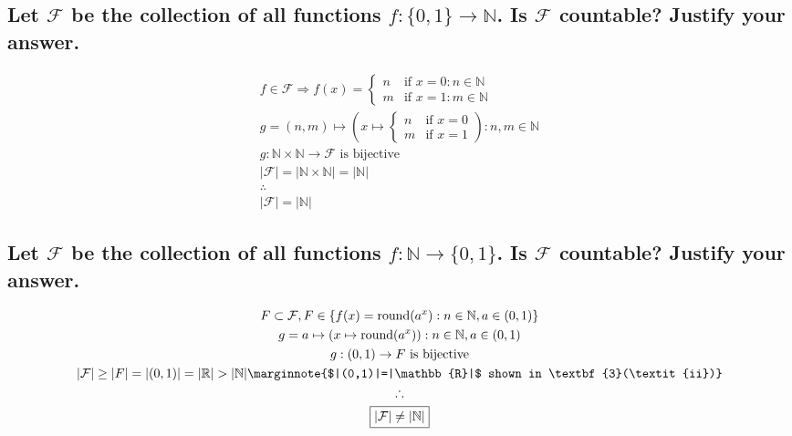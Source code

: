 \documentclass[letterpaper]{article}
\begin{document}
\subsection{Let $\mathcal{F}$ be the collection of all functions $f:\{0,1\}\rightarrow\mathbb{N}$. Is $\mathcal{F}$ countable? Justify your answer.}
\begin{gather*}
f\in\mathcal{F}\Rightarrow f(x)=\begin{cases}
n & \text{if } x=0:n\in\mathbb{N} \\
m & \text{if } x=1:m\in\mathbb{N}
\end{cases} \\
g=(n,m)\mapsto (x\mapsto\begin{cases}
n & \text{if } x=0 \\
m & \text{if } x=1
\end{cases}):n,m\in\mathbb{N} \\
g:\mathbb{N}\times\mathbb{N}\rightarrow\mathcal{F}\text{ is bijective} \\
|\mathcal{F}|=|\mathbb{N}\times\mathbb{N}|=|\mathbb{N}| \\
\therefore \\
\boxed{|\mathcal{F}|=|\mathbb{N}|}
\end{gather*}
\subsection{Let $\mathcal{F}$ be the collection of all functions $f:\mathbb{N}\rightarrow\{0,1\}$. Is $\mathcal{F}$ countable? Justify your answer.}
\begin{gather*}
F\subset\mathcal{F},F\in \{f(x)=\text{round}(a^x): n\in\mathbb{N},a\in(0, 1)\} \\
g=a\mapsto(x\mapsto\text{round}(a^x)):n\in\mathbb{N},a\in(0, 1) \\
g:(0,1)\rightarrow F\text{ is bijective} \\
|\mathcal{F}|\geq|F|=|(0,1)|=|\mathbb{R}|>|\mathbb{N}| \marginnote{$|(0,1)|=|\mathbb{R}|$ shown in \textbf{3}(\textit{ii})} \\
\therefore \\
\boxed{|\mathcal{F}|\neq|\mathbb{N}|}
\end{gather*}
\end{document}
